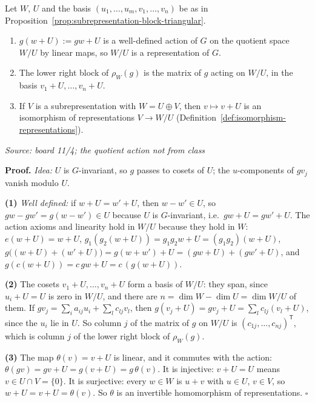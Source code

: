 \documentclass[11pt]{report}
\renewenvironment{proof}[1][Proof]{\noindent\textbf{#1.} }{\hfill$\square$\par\vspace{5pt}}
\newcommand{\srcline}[1]{\par\hfill{\footnotesize\textit{Source: #1}}}
\begin{document}
\begin{propbox}\label{prop:lower-right-block-quotient-representation}
Let $W$, $U$ and the basis $(u_1, \ldots, u_m, v_1, \ldots, v_n)$ be as in Proposition~\ref{prop:subrepresentation-block-triangular}.
\begin{enumerate}
    \item $g(w + U) := gw + U$ is a well-defined action of $G$ on the quotient space $W/U$ by linear maps, so $W/U$ is a representation of $G$.
    \item The lower right block of $\rho_W(g)$ is the matrix of $g$ acting on $W/U$, in the basis $v_1 + U, \ldots, v_n + U$.
    \item If $V$ is a subrepresentation with $W = U \oplus V$, then $v \mapsto v + U$ is an isomorphism of representations $V \to W/U$ (Definition~\ref{def:isomorphism-representations}).
\end{enumerate}
\srcline{board 11/4; the quotient action not from class}
\end{propbox}

\begin{proof}
\textit{Idea:} $U$ is $G$-invariant, so $g$ passes to cosets of $U$; the $u$-components of $gv_j$ vanish modulo $U$.\par
\textbf{(1)} \emph{Well defined:} if $w + U = w' + U$, then $w - w' \in U$, so $gw - gw' = g(w - w') \in U$ because $U$ is $G$-invariant, i.e.\ $gw + U = gw' + U$. The action axioms and linearity hold in $W/U$ because they hold in $W$: $e(w + U) = w + U$, $g_1(g_2(w + U)) = g_1g_2w + U = (g_1g_2)(w + U)$, $g\big((w + U) + (w' + U)\big) = g(w + w') + U = (gw + U) + (gw' + U)$, and $g(c(w + U)) = c\,gw + U = c\,(g(w + U))$.

\textbf{(2)} The cosets $v_1 + U, \ldots, v_n + U$ form a basis of $W/U$: they span, since $u_i + U = U$ is zero in $W/U$, and there are $n = \dim W - \dim U = \dim W/U$ of them. If $gv_j = \sum_i a_{ij}u_i + \sum_l c_{lj}v_l$, then $g(v_j + U) = gv_j + U = \sum_l c_{lj}(v_l + U)$, since the $u_i$ lie in $U$. So column $j$ of the matrix of $g$ on $W/U$ is $(c_{1j}, \ldots, c_{nj})^{\mathsf{T}}$, which is column $j$ of the lower right block of $\rho_W(g)$.

\textbf{(3)} The map $\theta(v) = v + U$ is linear, and it commutes with the action: $\theta(gv) = gv + U = g(v + U) = g\,\theta(v)$. It is injective: $v + U = U$ means $v \in U \cap V = \{0\}$. It is surjective: every $w \in W$ is $u + v$ with $u \in U$, $v \in V$, so $w + U = v + U = \theta(v)$. So $\theta$ is an invertible homomorphism of representations.
\end{proof}
\end{document}
